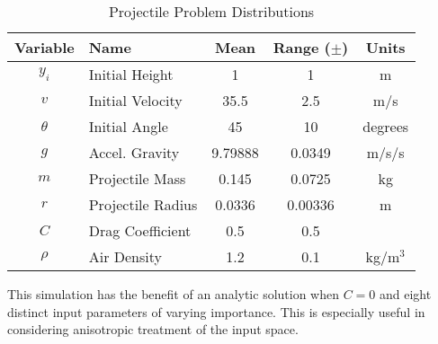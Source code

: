 \begin{table}[h]
\centering
\begin{tabular}{c | l | c c | c}
  Variable & Name & Mean & Range ($\pm$) & Units \\\hline
  $y_i$ & Initial Height & 1 & 1 & m\\
  $v$ & Initial Velocity & 35.5 & 2.5 & m/s\\
  $\theta$ & Initial Angle & 45 & 10 & degrees\\
  $g$ & Accel. Gravity & 9.79888 & 0.0349 & m/s/s\\
  $m$ & Projectile Mass & 0.145 & 0.0725 & kg\\
  $r$ & Projectile Radius & 0.0336 & 0.00336 & m\\
  $C$ & Drag Coefficient & 0.5 & 0.5 & \\
  $\rho$ & Air Density & 1.2 & 0.1 & kg/m$^3$ \\
\end{tabular}
\caption{Projectile Problem Distributions}
\label{tab:proj dist}
\end{table}

This simulation has the benefit of an analytic solution when $C=0$ and eight distinct input parameters of
varying importance.  This is especially useful in considering anisotropic treatment of the input space.




